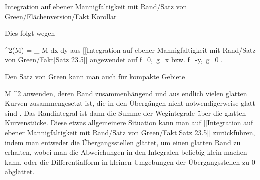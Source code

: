 {Integration auf ebener Mannigfaltigkeit mit Rand/Satz von Green/Flächenversion/Fakt}
{Korollar}
{}
{

\faktzusatz {}
\faktzusatz {}

}
{

Dies folgt wegen

\mavergleichskette
{\vergleichskette
{ \lambda^2(M)
}
{ = }{
\int_{ M  }  dx \wedge dy
}
{  }{
}
{    }{
}
{   }{
}
}
{}{}{}
aus
[[Integration auf ebener Mannigfaltigkeit mit Rand/Satz von Green/Fakt|Satz 23.5]]
angewendet auf
\mathkor {} {f=0,\, g=x} {bzw.} {f=-y,\, g=0} {.}

}

{}
{

Den Satz von Green kann man auch für kompakte Gebiete

\mavergleichskette
{\vergleichskette
{ M
}
{ \subseteq }{ \R^2
}
{  }{
}
{    }{
}
{   }{
}
}
{}{}{}
anwenden, deren
 {} {}
Rand zusammenhängend und aus endlich vielen glatten Kurven zusammengesetzt ist, die in den Übergängen nicht notwendigerweise glatt sind
 {} {.}
Das Randintegral ist dann die Summe der Wegintegrale über die glatten Kurvenstücke. Diese etwas allgemeinere Situation kann man auf
[[Integration auf ebener Mannigfaltigkeit mit Rand/Satz von Green/Fakt|Satz 23.5]]
zurückführen, indem man entweder die Übergangsstellen glättet, um einen glatten Rand zu erhalten, wobei man die Abweichungen in den Integralen beliebig klein machen kann, oder die Differentialform in kleinen Umgebungen der Übergangsstellen zu $0$ abglättet.

}

